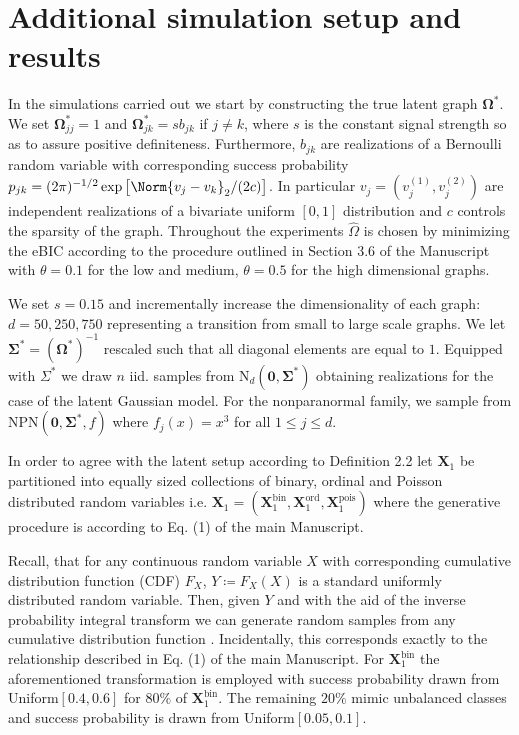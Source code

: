 
\section{Additional simulation setup and results}\label{sec::additional_setup_results}

In the simulations carried out we start by constructing the true latent graph $\boldsymbol{\Omega}^*$. We set $\boldsymbol{\Omega}^*_{jj} = 1$ and $\boldsymbol{\Omega}_{jk}^* = s b_{jk}$ if $j\neq k$, where $s$ is the constant signal strength so as to assure positive definiteness. Furthermore, $b_{jk}$ are realizations of a Bernoulli random variable with corresponding success probability $p_{jk} = (2\pi)^{-1/2} \exp\big[\Norm{v_j - v_k}_2 / (2c) \big]$. In particular $v_j = (v_j^{(1)}, v_j^{(2)})$ are independent realizations of a bivariate uniform $[0,1]$ distribution and $c$ controls the sparsity of the graph. Throughout the experiments $\hat{\Omega}$ is chosen by minimizing the eBIC according to the procedure outlined in Section 3.6 of the Manuscript %
with $\theta = 0.1$ for the low and medium, $\theta = 0.5$ for the high dimensional graphs. 

We set $s = 0.15$ and incrementally increase the dimensionality of each graph: $d= 50,250,750$ representing a transition from small to large scale graphs. We let $\boldsymbol{\Sigma}^* = (\boldsymbol{\Omega}^*)^{-1}$ rescaled such that all diagonal elements are equal to $1$. Equipped with $\Sigma^*$ we draw $n$ iid. samples from $\text{N}_d(\boldsymbol{0}, \boldsymbol{\Sigma}^*)$ obtaining realizations for the case of the latent Gaussian model. For the nonparanormal family, we sample from $\text{NPN}(\boldsymbol{0}, \boldsymbol{\Sigma}^*, f)$ where $f_j(x) = x^3$ for all $1 \leq j \leq d$. 

In order to agree with the latent setup according to Definition 2.2
let $\boldsymbol{X}_1$ be partitioned into equally sized collections of binary, ordinal and Poisson distributed random variables i.e. $\boldsymbol{X}_1 = (\boldsymbol{X}_1^{\text{bin}}, \boldsymbol{X}_1^{\text{ord}},\boldsymbol{X}_1^{\text{pois}})$ where the generative procedure is according to Eq. (1) of the main Manuscript. %

Recall, that for any continuous random variable $X$ with corresponding cumulative distribution function (CDF) $F_X$, $Y \coloneqq F_X(X)$ is a standard uniformly distributed random variable. Then, given $Y$ and with the aid of the inverse probability integral transform we can generate random samples from any cumulative distribution function \citep{Angus94}. Incidentally, this corresponds exactly to the relationship described in Eq. (1) of the main Manuscript.
For $\boldsymbol{X}_1^{\text{bin}}$ the aforementioned transformation is employed with success probability drawn from Uniform$[0.4,0.6]$ for $80\%$ of $\boldsymbol{X}_1^{\text{bin}}$. The remaining $20\%$ mimic unbalanced classes and success probability is drawn from Uniform$[0.05,0.1]$.         


